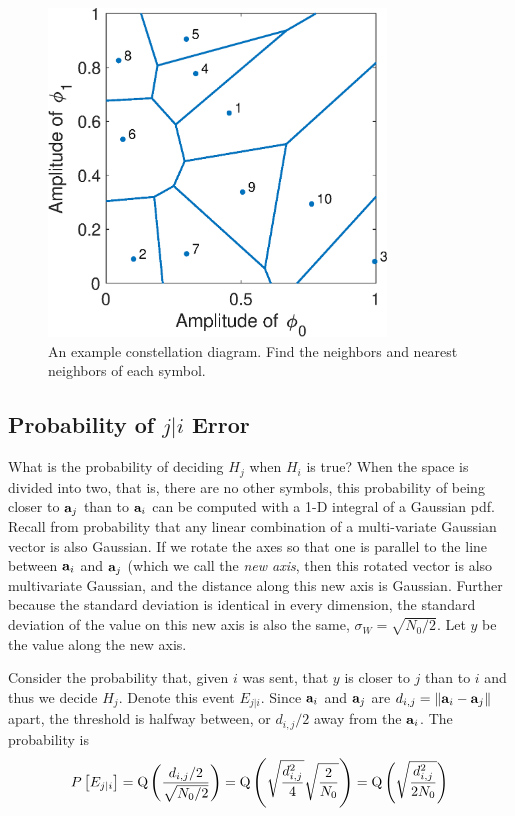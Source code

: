 \begin{figure}[htbp]
  \centerline{\includegraphics[width=0.8\textwidth]{../images/ExampleVoronoiDiagramLabelledSolutions.eps} }
  \caption{An example constellation diagram.  Find the neighbors and nearest neighbors of each symbol.  }
  \label{F:ExampleVoronoiDiagramLabelledSolutions}
\end{figure}


\subsection{Probability of $j|i$ Error}

What is the probability of deciding $H_j$ when $H_i$ is true?  When the space is divided into two, that is, there are no other symbols, this probability of being closer to $\mathbf{a}_j$ than to $\mathbf{a}_i$ can be computed with a 1-D integral of a Gaussian pdf.  Recall from probability that any linear combination of a multi-variate Gaussian vector is also Gaussian.  If we rotate the axes so that one is parallel to the line between $\mathbf{a}_i$ and $\mathbf{a}_j$ (which we call the \emph{new axis}, then this rotated vector is also multivariate Gaussian, and the distance along this new axis is Gaussian.  Further because the standard deviation is identical in every dimension, the standard deviation of the value on this new axis is also the same, $\sigma_W = \sqrt{N_0/2}$.  Let $y$ be the value along the new axis.

Consider the probability that, given $i$ was sent, that $y$ is closer to $j$ than to $i$ and thus we decide $H_j$.  Denote this event $E_{j|i}$.  Since $\mathbf{a}_i$ and $\mathbf{a}_j$ are $d_{i,j} = \| \mathbf{a}_i - \mathbf{a}_j\|$ apart, the threshold is halfway between, or  $d_{i,j}/2$ away from the $\mathbf{a}_i$.  The probability is
\begin{equation} \label{E:RicePairwiseErrorPrep}
  P\left[{E_{j|i}}\right] = {\mbox{Q}\left( { 
  \frac{d_{i,j}/2}{\sqrt{N_0/2}}
  } \right)}
  = 
  {\mbox{Q}\left( {
  \sqrt{\frac{d_{i,j}^2}{4}}\sqrt{\frac{2}{N_0}}
  } \right)}
  = 
  {\mbox{Q}\left( { 
  \sqrt{\frac{d_{i,j}^2}{2N_0}}
  } \right)}
\end{equation}

